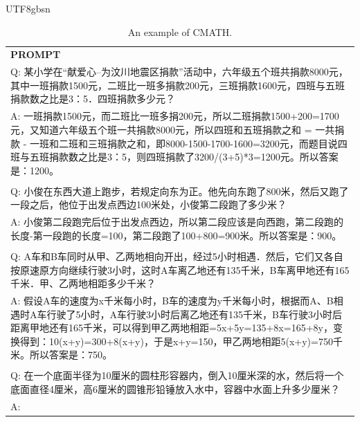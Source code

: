 \documentclass[11pt, a4paper, logo, copyright, nonumbering]{deepseek}
\begin{document}
\begin{CJK*}{UTF8}{gbsn}
\begin{table}[h]
    \centering \small
\begin{tabular}{p{12cm}}
\toprule
\textbf{PROMPT}\\
Q: 某小学在“献爱心--为汶川地震区捐款”活动中，六年级五个班共捐款8000元，其中一班捐款1500元，二班比一班多捐款200元，三班捐款1600元，四班与五班捐款数之比是3：5．四班捐款多少元？
\\A: 一班捐款1500元，而二班比一班多捐200元，所以二班捐款1500+200=1700元，又知道六年级五个班一共捐款8000元，所以四班和五班捐款之和 = 一共捐款 - 一班和二班和三班捐款之和，即8000-1500-1700-1600=3200元，而题目说四班与五班捐款数之比是3：5，则四班捐款了3200/(3+5)*3=1200元。所以答案是：1200。
\\
\\Q: 小俊在东西大道上跑步，若规定向东为正。他先向东跑了800米，然后又跑了一段之后，他位于出发点西边100米处，小俊第二段跑了多少米？
\\A: 小俊第二段跑完后位于出发点西边，所以第二段应该是向西跑，第二段跑的长度-第一段跑的长度=100，第二段跑了100+800=900米。所以答案是：900。
\\
\\Q: A车和B车同时从甲、乙两地相向开出，经过5小时相遇．然后，它们又各自按原速原方向继续行驶3小时，这时A车离乙地还有135千米，B车离甲地还有165千米．甲、乙两地相距多少千米？
\\A: 假设A车的速度为x千米每小时，B车的速度为y千米每小时，根据而A、B相遇时A车行驶了5小时，A车行驶3小时后离乙地还有135千米，B车行驶3小时后距离甲地还有165千米，可以得到甲乙两地相距=5x+5y=135+8x=165+8y，变换得到：10(x+y)=300+8(x+y)，于是x+y=150，甲乙两地相距5(x+y)=750千米。所以答案是：750。
\\
\\Q: 在一个底面半径为10厘米的圆柱形容器内，倒入10厘米深的水，然后将一个底面直径4厘米，高6厘米的圆锥形铅锤放入水中，容器中水面上升多少厘米？
\\A:\\
\bottomrule
\end{tabular}
    \caption{\centering An example of CMATH.}
    \label{tab:cmath_eval_format_example}
\end{table}


\end{CJK*}
\end{document}
